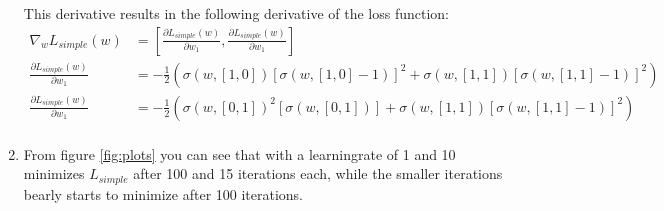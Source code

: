 \documentclass{article}
\begin{document}
\begin{enumerate}
  This derivative results in the following derivative of the loss function:
  \begin{align*}
    \nabla_wL_{simple}(w) &= \left[ \frac{\partial L_{simple}(w)}{\partial w_1},
                                \frac{\partial L_{simple}(w)}{\partial w_1} \right] \\
    \frac{\partial L_{simple}(w)}{\partial w_1} &=
      - \frac{1}{2} \left( \sigma(w,[1,0])\left[ \sigma(w,[1,0] - 1) \right]^2 +
      \sigma(w,[1,1])\left[ \sigma(w,[1,1] - 1) \right]^2 \right) \\
    \frac{\partial L_{simple}(w)}{\partial w_1} &=
      - \frac{1}{2} \left( \sigma(w,[0,1])^2\left[ \sigma(w,[0,1]) \right] +
      \sigma(w,[1,1])\left[ \sigma(w,[1,1] - 1) \right]^2 \right) \\
  \end{align*}

\item From  figure \ref{fig:plots} you can see that with a learningrate of 1 and
  10 minimizes $L_{simple}$ after 100 and 15 iterations each, while the smaller
  iterations bearly starts to minimize after 100 iterations.
\end{enumerate}
\end{document}
